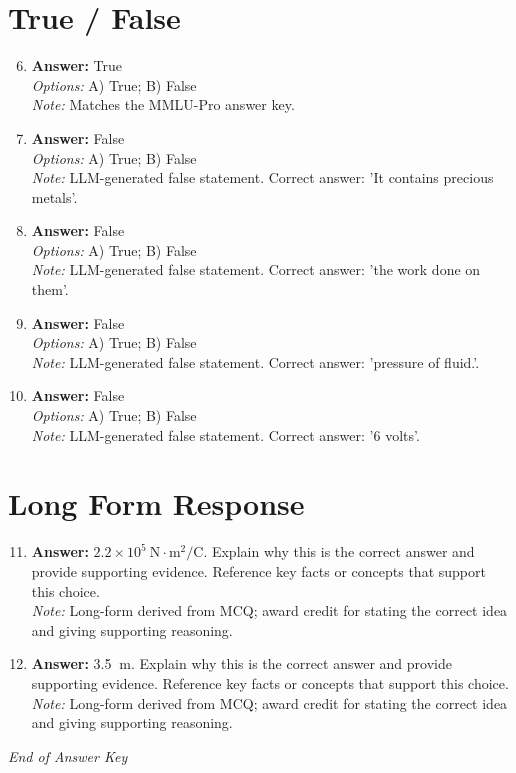 \documentclass[12pt]{article}
\begin{document}
\section*{True / False}
\begin{enumerate}[label=\arabic*.]
\setcounter{enumi}{5}
\item \textbf{Answer:} True
\\ \textit{Options:} A) True; B) False
\\ \textit{Note:} Matches the MMLU-Pro answer key.
\item \textbf{Answer:} False
\\ \textit{Options:} A) True; B) False
\\ \textit{Note:} LLM-generated false statement. Correct answer: 'It contains precious metals'.
\item \textbf{Answer:} False
\\ \textit{Options:} A) True; B) False
\\ \textit{Note:} LLM-generated false statement. Correct answer: 'the work done on them'.
\item \textbf{Answer:} False
\\ \textit{Options:} A) True; B) False
\\ \textit{Note:} LLM-generated false statement. Correct answer: 'pressure of fluid.'.
\item \textbf{Answer:} False
\\ \textit{Options:} A) True; B) False
\\ \textit{Note:} LLM-generated false statement. Correct answer: '6 volts'.
\end{enumerate}

\section*{Long Form Response}
\begin{enumerate}[label=\arabic*.]
\setcounter{enumi}{10}
\item \textbf{Answer:} $2.2 \times 10^5 \mathrm{~N} \cdot \mathrm{m}^2 / \mathrm{C}$. Explain why this is the correct answer and provide supporting evidence. Reference key facts or concepts that support this choice.
\\ \textit{Note:} Long-form derived from MCQ; award credit for stating the correct idea and giving supporting reasoning.
\item \textbf{Answer:} 3.5 $\mathrm{~m}$. Explain why this is the correct answer and provide supporting evidence. Reference key facts or concepts that support this choice.
\\ \textit{Note:} Long-form derived from MCQ; award credit for stating the correct idea and giving supporting reasoning.
\end{enumerate}

\vfill
\noindent\textit{End of Answer Key}
\end{document}
